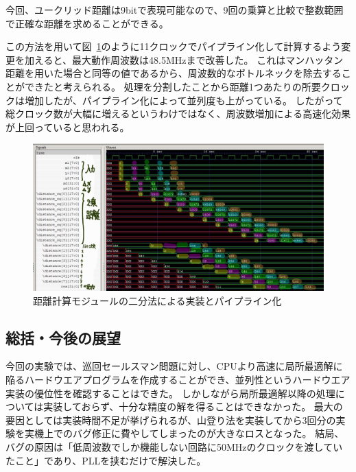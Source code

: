 今回、ユークリッド距離は9bitで表現可能なので、9回の乗算と比較で整数範囲で正確な距離を求めることができる。

この方法を用いて図~\ref{fig:distance_binary}のように11クロックでパイプライン化して計算するよう変更を加えると、最大動作周波数は48.5MHzまで改善した。
これはマンハッタン距離を用いた場合と同等の値であるから、周波数的なボトルネックを除去することができたと考えられる。
処理を分割したことから距離1つあたりの所要クロックは増加したが、パイプライン化によって並列度も上がっている。
したがって総クロック数が大幅に増えるというわけではなく、周波数増加による高速化効果が上回っていると思われる。

\begin{figure}[h]
    \begin{center}
        \includegraphics[width=15cm]{figure/distance_binary.jpg}
        \caption{距離計算モジュールの二分法による実装とパイプライン化}\label{fig:distance_binary}
    \end{center}
\end{figure}

\subsection{総括・今後の展望}
今回の実験では、巡回セールスマン問題に対し、CPUより高速に局所最適解に陥るハードウエアプログラムを作成することができ、並列性というハードウエア実装の優位性を確認することはできた。
しかしながら局所最適解以降の処理については実装しておらず、十分な精度の解を得ることはできなかった。
最大の要因としては実装時間不足が挙げられるが、山登り法を実装してから3回分の実験を実機上でのバグ修正に費やしてしまったのが大きなロスとなった。
結局、バグの原因は「低周波数でしか機能しない回路に50MHzのクロックを渡していたこと」であり、PLLを挟むだけで解決した。

